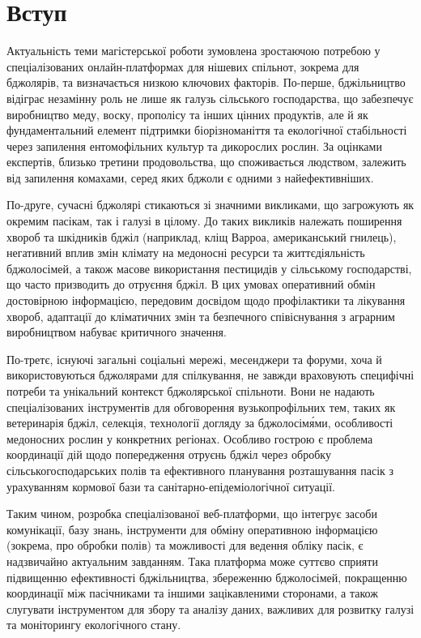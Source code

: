 \chapter*{Вступ}
\label{ch:introduction}

Актуальність теми магістерської роботи зумовлена зростаючою потребою у спеціалізованих онлайн-платформах для нішевих спільнот, зокрема для бджолярів, та визначається низкою ключових факторів. По-перше, бджільництво відіграє незамінну роль не лише як галузь сільського господарства, що забезпечує виробництво меду, воску, прополісу та інших цінних продуктів, але й як фундаментальний елемент підтримки біорізноманіття та екологічної стабільності через запилення ентомофільних культур та дикорослих рослин. За оцінками експертів, близько третини продовольства, що споживається людством, залежить від запилення комахами, серед яких бджоли є одними з найефективніших.

По-друге, сучасні бджолярі стикаються зі значними викликами, що загрожують як окремим пасікам, так і галузі в цілому. До таких викликів належать поширення хвороб та шкідників бджіл (наприклад, кліщ Варроа, американський гнилець), негативний вплив змін клімату на медоносні ресурси та життєдіяльність бджолосімей, а також масове використання пестицидів у сільському господарстві, що часто призводить до отруєння бджіл. В цих умовах оперативний обмін достовірною інформацією, передовим досвідом щодо профілактики та лікування хвороб, адаптації до кліматичних змін та безпечного співіснування з аграрним виробництвом набуває критичного значення.

По-третє, існуючі загальні соціальні мережі, месенджери та форуми, хоча й використовуються бджолярами для спілкування, не завжди враховують специфічні потреби та унікальний контекст бджолярської спільноти. Вони не надають спеціалізованих інструментів для обговорення вузькопрофільних тем, таких як ветеринарія бджіл, селекція, технології догляду за бджолосім\'ями, особливості медоносних рослин у конкретних регіонах. Особливо гострою є проблема координації дій щодо попередження отруєнь бджіл через обробку сільськогосподарських полів та ефективного планування розташування пасік з урахуванням кормової бази та санітарно-епідеміологічної ситуації.

Таким чином, розробка спеціалізованої веб-платформи, що інтегрує засоби комунікації, базу знань, інструменти для обміну оперативною інформацією (зокрема, про обробки полів) та можливості для ведення обліку пасік, є надзвичайно актуальним завданням. Така платформа може суттєво сприяти підвищенню ефективності бджільництва, збереженню бджолосімей, покращенню координації між пасічниками та іншими зацікавленими сторонами, а також слугувати інструментом для збору та аналізу даних, важливих для розвитку галузі та моніторингу екологічного стану.

